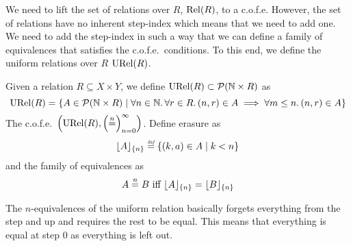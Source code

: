 \begin{jversion}
We need to lift the set of relations over $R$, $\mathrm{Rel}(R)$, to a c.o.f.e.
However, the set of relations have no inherent step-index which means that we need to add one.
We need to add the step-index in such a way that we can define a family of equivalences that satisfies the c.o.f.e.\ conditions.
To this end, we define the uniform relations over $R$ $\mathrm{URel}(R)$.
\begin{definition}
  Given a relation $R \subseteq X \times Y$, we define $\mathrm{URel}(R) \subset \mathcal{P}(\mathbb{N} \times R)$ as
  \[
    \mathrm{URel}(R) = \{ A \in \mathcal{P}(\mathbb{N} \times R) \mid \forall n \in \mathbb{N}\ldotp \forall r \in R \ldotp \left(n,r\right) \in A \implies \forall m \leq n \ldotp (n,r) \in A\}
  \]
  The c.o.f.e.\ $\left(\mathrm{URel}(R),\left(\overset{n}{=}\right)_{n=0}^{\infty} \right)$. Define erasure as
  \[
    \lfloor A \rfloor_{\{n\}} \stackrel{\textit{\tiny{def}}}{=} \{(k,a) \in A \mid k < n\}
  \]
  and the family of equivalences as
  \[
    A \overset{n}{=} B \text{ iff } \lfloor A \rfloor_{\{n\}} = \lfloor B \rfloor_{\{n\}}
  \]
\end{definition}
The $n$-equivalences of the uniform relation basically forgets everything from the step and up and requires the rest to be equal.
This means that everything is equal at step $0$ as everything is left out.


\end{jversion}
